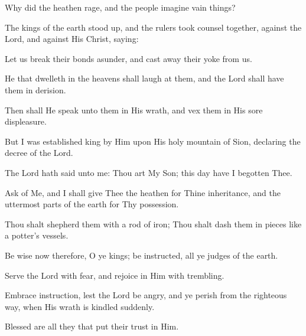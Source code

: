 Why did the heathen rage, and the people imagine vain things?

The kings of the earth stood up, and the rulers took counsel together, against the Lord, and against His Christ, saying:

Let us break their bonds asunder, and cast away their yoke from us.

He that dwelleth in the heavens shall laugh at them, and the Lord shall have them in derision.

Then shall He speak unto them in His wrath, and vex them in His sore displeasure.

But I was established king by Him upon His holy mountain of Sion, declaring the decree of the Lord.

The Lord hath said unto me: Thou art My Son; this day have I begotten Thee.

Ask of Me, and I shall give Thee the heathen for Thine inheritance, and the uttermost parts of the earth for Thy possession.

Thou shalt shepherd them with a rod of iron; Thou shalt dash them in pieces like a potter's vessels.

Be wise now therefore, O ye kings; be instructed, all ye judges of the earth.

Serve the Lord with fear, and rejoice in Him with trembling.

Embrace instruction, lest the Lord be angry, and ye perish from the righteous way, when His wrath is kindled suddenly.

Blessed are all they that put their trust in Him.
